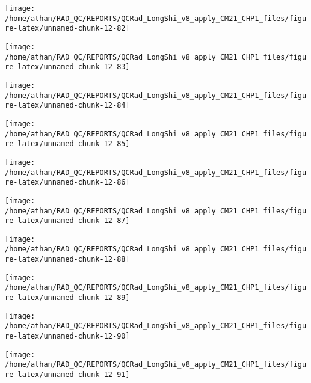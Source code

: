 \documentclass[
  10pt,
  a4paper,oneside]{article}
\begin{document}
\begin{center}\texttt{[image: /home/athan/RAD\_QC/REPORTS/QCRad\_LongShi\_v8\_apply\_CM21\_CHP1\_files/figure-latex/unnamed-chunk-12-82]} \end{center}

\begin{center}\texttt{[image: /home/athan/RAD\_QC/REPORTS/QCRad\_LongShi\_v8\_apply\_CM21\_CHP1\_files/figure-latex/unnamed-chunk-12-83]} \end{center}

\begin{center}\texttt{[image: /home/athan/RAD\_QC/REPORTS/QCRad\_LongShi\_v8\_apply\_CM21\_CHP1\_files/figure-latex/unnamed-chunk-12-84]} \end{center}

\begin{center}\texttt{[image: /home/athan/RAD\_QC/REPORTS/QCRad\_LongShi\_v8\_apply\_CM21\_CHP1\_files/figure-latex/unnamed-chunk-12-85]} \end{center}

\begin{center}\texttt{[image: /home/athan/RAD\_QC/REPORTS/QCRad\_LongShi\_v8\_apply\_CM21\_CHP1\_files/figure-latex/unnamed-chunk-12-86]} \end{center}

\begin{center}\texttt{[image: /home/athan/RAD\_QC/REPORTS/QCRad\_LongShi\_v8\_apply\_CM21\_CHP1\_files/figure-latex/unnamed-chunk-12-87]} \end{center}

\begin{center}\texttt{[image: /home/athan/RAD\_QC/REPORTS/QCRad\_LongShi\_v8\_apply\_CM21\_CHP1\_files/figure-latex/unnamed-chunk-12-88]} \end{center}

\begin{center}\texttt{[image: /home/athan/RAD\_QC/REPORTS/QCRad\_LongShi\_v8\_apply\_CM21\_CHP1\_files/figure-latex/unnamed-chunk-12-89]} \end{center}

\begin{center}\texttt{[image: /home/athan/RAD\_QC/REPORTS/QCRad\_LongShi\_v8\_apply\_CM21\_CHP1\_files/figure-latex/unnamed-chunk-12-90]} \end{center}

\begin{center}\texttt{[image: /home/athan/RAD\_QC/REPORTS/QCRad\_LongShi\_v8\_apply\_CM21\_CHP1\_files/figure-latex/unnamed-chunk-12-91]} \end{center}
\end{document}

